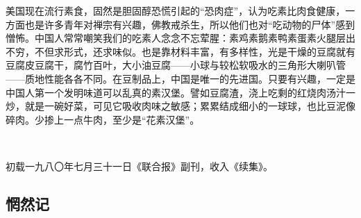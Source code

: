 \par 美国现在流行素食，固然是胆固醇恐慌引起的“恐肉症”，认为吃素比肉食健康，一方面也是许多青年对禅宗有兴趣，佛教戒杀生，所以他们也对“吃动物的尸体”感到憎怖。中国人常常嘲笑我们的吃素人念念不忘荤腥：素鸡素鹅素鸭素蛋素火腿层出不穷，不但求形式，还求味似。也是靠材料丰富，有多样性，光是干燥的豆腐就有豆腐皮豆腐干，腐竹百叶，大小油豆腐——小球与较松软吸水的三角形大喇叭管——质地性能各各不同。在豆制品上，中国是唯一的先进国。只要有兴趣，一定是中国人第一个发明味道可以乱真的素汉堡。譬如豆腐渣，浇上吃剩的红烧肉汤汁一炒，就是一碗好菜，可见它吸收肉味之敏感；累累结成细小的一球球，也比豆泥像碎肉。少掺上一点牛肉，至少是“花素汉堡”。
\par  
\par *初载一九八〇年七月三十一日《联合报》副刊，收入《续集》。



\subsection{惘然记}


